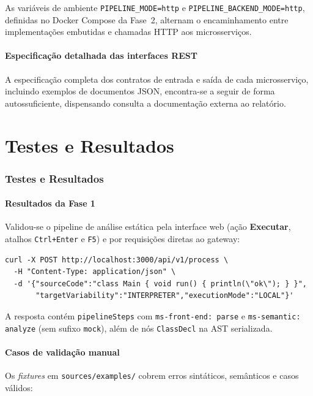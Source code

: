 \documentclass[12pt]{article}
\begin{document}
As variáveis de ambiente \texttt{PIPELINE\_MODE=http} e \texttt{PIPELINE\_BACKEND\_MODE=http}, definidas no Docker Compose da Fase~2, alternam o encaminhamento entre implementações embutidas e chamadas HTTP aos microsserviços.

\subsection{Especificação detalhada das interfaces REST}
\label{sec:rest-api}

A especificação completa dos contratos de entrada e saída de cada microsserviço, incluindo exemplos de documentos JSON, encontra-se a seguir de forma autossuficiente, dispensando consulta a documentação externa ao relatório.



\part{Testes e Resultados}

\section{Testes e Resultados}
\subsection{Resultados da Fase 1}
Validou-se o pipeline de análise estática pela interface web (ação \textbf{Executar}, atalhos \texttt{Ctrl+Enter} e \texttt{F5}) e por requisições diretas ao gateway:

\begin{lstlisting}[caption={Exemplo curl --- AST e symbolTable reais}]
curl -X POST http://localhost:3000/api/v1/process \
  -H "Content-Type: application/json" \
  -d '{"sourceCode":"class Main { void run() { println(\"ok\"); } }",
       "targetVariability":"INTERPRETER","executionMode":"LOCAL"}'
\end{lstlisting}

A resposta contém \texttt{pipelineSteps} com \texttt{ms-front-end: parse} e \texttt{ms-semantic: analyze} (sem sufixo \texttt{mock}), além de nós \texttt{ClassDecl} na AST serializada.

\subsection{Casos de validação manual}
Os \emph{fixtures} em \texttt{sources/examples/} cobrem erros sintáticos, semânticos e casos válidos:
\end{document}
